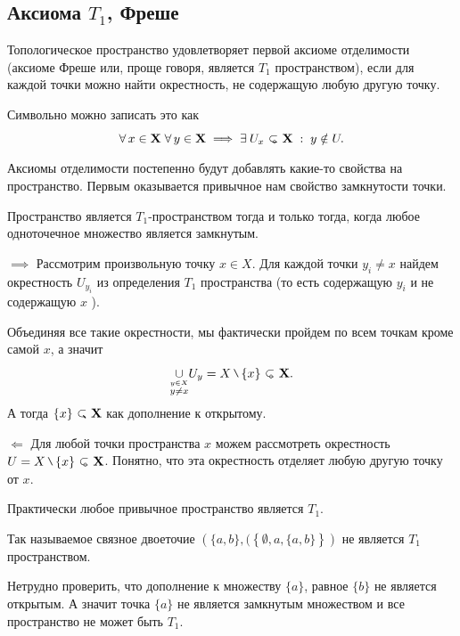 \subsection{Аксиома $T_1$, Фреше}
\begin{Def}
    Топологическое пространство \topX удовлетворяет первой аксиоме отделимости (аксиоме Фреше или, проще говоря, является $T_1$ пространством), если для каждой точки можно найти окрестность, не содержащую любую другую точку.

    Символьно можно записать это как
    \[
    \forall x\in \X \; \forall y\in \X \implies \exists U_x\open \X \st y \notin U.
    \] 
\end{Def}

Аксиомы отделимости постепенно будут добавлять какие-то свойства на пространство. Первым оказывается привычное нам свойство замкнутости точки.

\begin{Lem}
    Пространство является $T_1$-пространством тогда и только тогда, когда любое одноточечное множество является замкнутым. 
\end{Lem}
\begin{Proof}
    $\implies$ Рассмотрим произвольную точку $x\in X$. Для каждой точки $y_i \ne x$ найдем окрестность $U_{y_i}$ из определения $T_1$ пространства (то есть содержащую $y_i$ и не содержащую $x$ ). 

    Объединяя все такие окрестности, мы фактически пройдем по всем точкам кроме самой $x$, а значит
    \[
        \underset{\tiny \stackrel{y\in X}{y\ne x}}{\cup} U_{y} = X \setminus \{x\} \open \X.
    \] 
    А тогда $\{x\} \closed \X$ как дополнение к открытому.

    $\Longleftarrow$ Для любой точки пространства $x$ можем рассмотреть окрестность $U = X \setminus \{x\} \open \X$. Понятно, что эта окрестность отделяет любую другую точку от $x$.
\end{Proof}

\begin{Ex}
    Практически любое привычное пространство является $T_1$.
\end{Ex}

\begin{Ex}
    Так называемое связное двоеточие $\left(\{a,b\}, (\left\{ \emptyset, a, \{a,b\} \right\}\right)$ не является $T_1$ пространством.

    Нетрудно проверить, что дополнение к множеству $\{a\}$, равное $\{b\}$ не является открытым. А значит точка $\{a\}$ не является замкнутым множеством и все пространство не может быть $T_1$.
\end{Ex}


